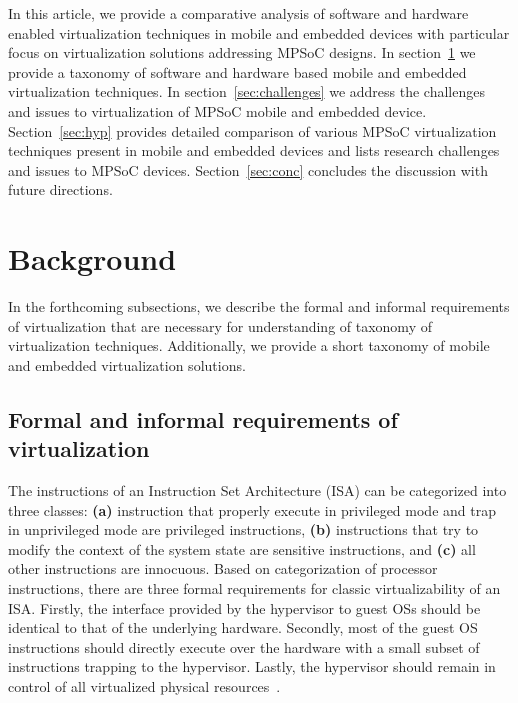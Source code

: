 \documentclass[journal, 10pt]{IEEEtran}
\begin{document}
In this article, we provide a comparative analysis of software and hardware enabled virtualization techniques in mobile and embedded devices with particular focus on virtualization solutions addressing MPSoC designs. In section~\ref{sec:back} we provide a taxonomy of software and hardware based mobile and embedded virtualization techniques. In section~\ref{sec:challenges} we address the challenges and issues to virtualization of MPSoC mobile and embedded device. Section~\ref{sec:hyp} provides detailed comparison of various MPSoC virtualization techniques present in mobile and embedded devices and lists research challenges and issues to MPSoC devices. Section~\ref{sec:conc} concludes the discussion with future directions.  

\section{Background}\label{sec:back}
In the forthcoming subsections, we describe the formal and informal requirements of virtualization that are necessary for understanding of taxonomy of virtualization techniques. Additionally, we provide a short taxonomy of mobile and embedded virtualization solutions.
\subsection{Formal and informal requirements of virtualization}\label{sec:form}
The instructions of an Instruction Set Architecture (ISA) can be categorized into three classes: \textbf{(a)} instruction that properly execute in privileged mode and trap in unprivileged mode are privileged instructions, \textbf{(b)} instructions that try to modify the context of the system state are sensitive instructions, and \textbf{(c)} all other instructions are innocuous. Based on categorization of processor instructions, there are three formal requirements for classic virtualizability of an ISA. Firstly, the interface provided by the hypervisor to guest OSs should be identical to that of the underlying hardware. Secondly, most of the guest OS instructions should directly execute over the hardware with a small subset of instructions trapping to the hypervisor. Lastly, the hypervisor should remain in control of all virtualized physical resources~\cite{Penneman2013}.
\end{document}
